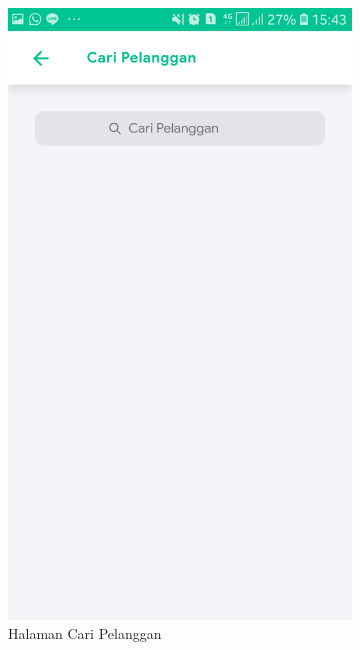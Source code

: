 	\begin{figure}[H]
		\centering
			\begin{subfigure}[b]{0.43\linewidth}
			\includegraphics [width = \linewidth]{gambar/android/cari-pelanggan}
			\caption{Halaman Cari Pelanggan}
		\end{subfigure}
		\begin{subfigure}[b]{0.43\linewidth}

\end{subfigure}
\end{figure}
